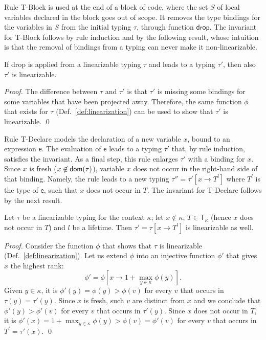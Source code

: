 Rule \textsf{T-Block} is used at the end of a
block of code, where the set $S$ of local
variables declared in the block goes out of scope. It removes
the type bindings for the variables in $S$ from the initial typing $\tau$,
through function $\mathsf{drop}$.
The invariant for \textsf{T-Block} follows by rule induction and by the following result,
whose intuition is that the removal of bindings from a typing can never make it non-linearizable.
%
\begin{lemma}\label{lem:drop_invariant}
  If \textsf{drop} is applied from a linearizable typing $\tau$
  and leads to a typing $\tau'$, then also $\tau'$ is linearizable.
\end{lemma}
\begin{proof}
  The difference between $\tau$ and $\tau'$ is that $\tau'$ is missing some
  bindings for some variables that have been projected away. Therefore,
  the same function $\phi$ that exists for $\tau$ (Def.~\ref{def:linearization})
  can be used to show that $\tau'$ is linearizable.
  \qed
\end{proof}

Rule \textsf{T-Declare} models the declaration
of a new variable $x$, bound to an expression $\mathsf{e}$. The evaluation of
$\mathsf{e}$ leads to a
typing $\tau'$ that, by rule induction, satisfies the invariant. As a final
step, this rule enlarges $\tau'$ with a binding for $x$. Since $x$ is
fresh ($x\not\in\mathsf{dom}(\tau)$),
variable $x$ does not occur in the right-hand side of that binding. Namely, the rule
leads to a new typing $\tau''=\tau'[x\to T^l]$ where $T^l$ is the type of $\mathsf{e}$, such that
$x$ does not occur in $T$. The invariant for \textsf{T-Declare} follows by the next result.

\begin{lemma}\label{lem:declare_invariant}
  Let $\tau$ be a linearizable typing for the context $\kappa$;
  let $x\not\in\kappa$, $T\in\mathsf{T}_\kappa$ (hence $x$ does not occur in $T$)
  and $l$ be a lifetime.
  Then $\tau'=\tau[x\to T^l]$ is linearizable as well.
\end{lemma}
\begin{proof}
  Consider the function $\phi$ that shows that $\tau$ is linearizable (Def.~\ref{def:linearization}).
  Let us extend $\phi$ into an injective function $\phi'$ that gives $x$ the highest rank:
  \[
  \phi'=\phi\left[x\to 1+\max\limits_{y\in\kappa}\phi(y)\right].
  \]
  Given $y\in\kappa$, it is $\phi'(y)=\phi(y)>\phi(v)$ for every $v$ that occurs
  in $\tau(y)=\tau'(y)$. Since $x$ is fresh, such $v$ are distinct from $x$ and we
  conclude that $\phi'(y)>\phi'(v)$ for every $v$ that occurs in $\tau'(y)$.
  Since $x$ does not occur in $T$, it is
  $\phi'(x)=1+\max_{y\in\kappa}\phi(y)>\phi(v)=\phi'(v)$ for every $v$ that occurs in $T^l=\tau'(x)$.
  \qed
\end{proof}

